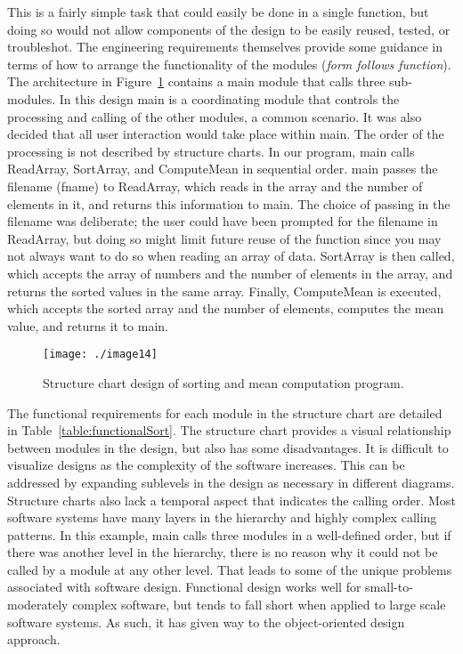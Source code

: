 This is a fairly simple task that could easily be done in a single
function, but doing so would not allow components of the design to be
easily reused, tested, or troubleshot. The engineering requirements
themselves provide some guidance in terms of how to arrange the
functionality of the modules (\emph{form follows function}). The
architecture in 
Figure~\ref{figure:structureChartSorting} contains a main module that calls three
sub-modules. In this design main is a coordinating module that controls
the processing and calling of the other modules, a common scenario. It
was also decided that all user interaction would take place within main.
The order of the processing is not described by structure charts. In our
program, main calls ReadArray, SortArray, and ComputeMean in sequential
order. main passes the filename (fname) to ReadArray, which reads in the
array and the number of elements in it, and returns this information to
main. The choice of passing in the filename was deliberate; the user
could have been prompted for the filename in ReadArray, but doing so
might limit future reuse of the function since you may not always want
to do so when reading an array of data. SortArray is then called, which
accepts the array of numbers and the number of elements in the array,
and returns the sorted values in the same array. Finally, ComputeMean is
executed, which accepts the sorted array and the number of elements,
computes the mean value, and returns it to main.

\begin{figure}[h]
\centering
\texttt{[image: ./image14]}
\caption{Structure chart design of sorting and mean
computation program.}
\label{figure:structureChartSorting}
\end{figure}


The functional requirements for each module in the structure chart are
detailed in Table~\ref{table:functionalSort}. 
The structure chart provides a visual
relationship between modules in the design, but also has some
disadvantages. It is difficult to visualize designs as the complexity of
the software increases. This can be addressed by expanding sublevels in
the design as necessary in different diagrams. Structure charts also
lack a temporal aspect that indicates the calling order. Most software
systems have many layers in the hierarchy and highly complex calling
patterns. In this example, main calls three modules in a well-defined
order, but if there was another level in the hierarchy, there is no
reason why it could not be called by a module at any other level. That
leads to some of the unique problems associated with software design.
Functional design works well for small-to-moderately complex software,
but tends to fall short when applied to large scale software systems. As
such, it has given way to the object-oriented design approach.

